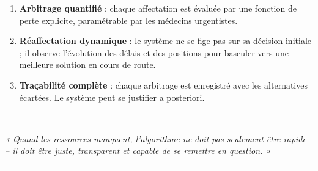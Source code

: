 \documentclass[12pt,a4paper]{article}
\theoremstyle{definition}
\theoremstyle{remark}
\begin{document}
\begin{enumerate}[leftmargin=2em, itemsep=4pt]
  \item \textbf{Arbitrage quantifié} : chaque affectation est évaluée
        par une fonction de perte explicite, paramétrable par les
        médecins urgentistes.
  \item \textbf{Réaffectation dynamique} : le système ne se fige pas
        sur sa décision initiale ; il observe l’évolution des délais
        et des positions pour basculer vers une meilleure solution
        en cours de route.
  \item \textbf{Traçabilité complète} : chaque arbitrage est enregistré
        avec les alternatives écartées. Le système peut se justifier
        a posteriori.
\end{enumerate}

\medskip
\begin{center}
  {\color{twist}\rule{0.5\linewidth}{1pt}}\\[0.5em]
  {\itshape « Quand les ressources manquent, l’algorithme ne doit
  pas seulement être rapide – il doit être juste, transparent et
  capable de se remettre en question. »}\\[0.5em]
  {\color{twist}\rule{0.5\linewidth}{1pt}}
\end{center}
\end{document}
